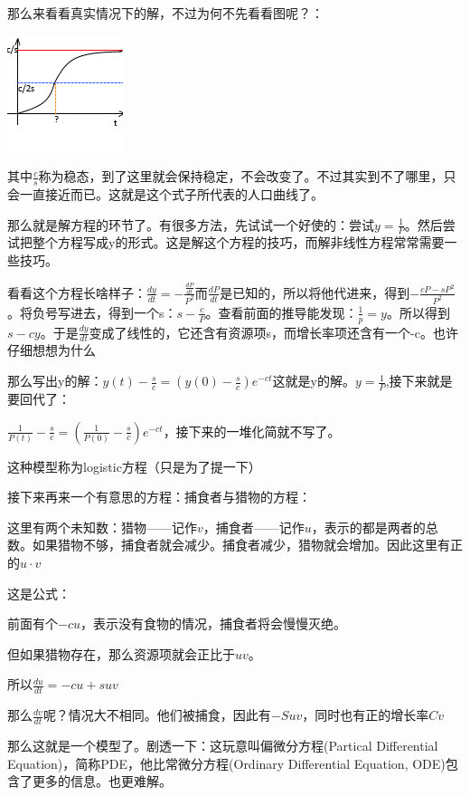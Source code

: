 \documentclass[UTF8]{ctexbook}
\begin{document}
{{{{  那么来看看真实情况下的解，不过为何不先看看图呢？：

  \includegraphics{resources/nonLinearDifferencialEquation_HumanGrow.png}

  其中$\frac{c}{s}$称为稳态，到了这里就会保持稳定，不会改变了。不过其实到不了哪里，只会一直接近而已。这就是这个式子所代表的人口曲线了。

  那么就是解方程的环节了。有很多方法，先试试一个好使的：尝试$y = \frac{1}{P}$。然后尝试把整个方程写成y的形式。这是解这个方程的技巧，而解非线性方程常常需要一些技巧。

  看看这个方程长啥样子：$\frac{dy}{dt} = -\frac{\frac{dP}{dt}}{P^2}$而$\frac{dP}{dt}$是已知的，所以将他代进来，得到$-\frac{cP - sP^2}{P^2}$。将负号写进去，得到一个s：$s - \frac{c}{P}$。查看前面的推导能发现：$\frac{1}{p} = y$。所以得到$s - cy$。于是$\frac{dy}{dt}$变成了线性的，它还含有资源项s，而增长率项还含有一个-c。也许仔细想想为什么

  那么写出y的解：$y(t) - \frac{s}{c} = (y(0) - \frac{s}{c})e^{-ct}$这就是y的解。$y = \frac{1}{P}$,接下来就是要回代了：

  $\frac{1}{P(t)} - \frac{s}{c} = (\frac{1}{P(0)} - \frac{s}{c})e^{-ct}$，接下来的一堆化简就不写了。

  这种模型称为logistic方程（只是为了提一下）

  接下来再来一个有意思的方程：捕食者与猎物的方程：

  这里有两个未知数：猎物——记作$v$，捕食者——记作$u$，表示的都是两者的总数。如果猎物不够，捕食者就会减少。捕食者减少，猎物就会增加。因此这里有正的$u \cdot v$

  这是公式：

  前面有个$-cu$，表示没有食物的情况，捕食者将会慢慢灭绝。

  但如果猎物存在，那么资源项就会正比于$uv$。

  所以$\frac{du}{dt} = -cu + suv$

  那么$\frac{dv}{dt}$呢？情况大不相同。他们被捕食，因此有$-Suv$，同时也有正的增长率$Cv$

  那么这就是一个模型了。剧透一下：这玩意叫偏微分方程(Partical Differential Equation)，简称PDE，他比常微分方程(Ordinary Differential Equation, ODE)包含了更多的信息。也更难解。

}}}}
\end{document}
